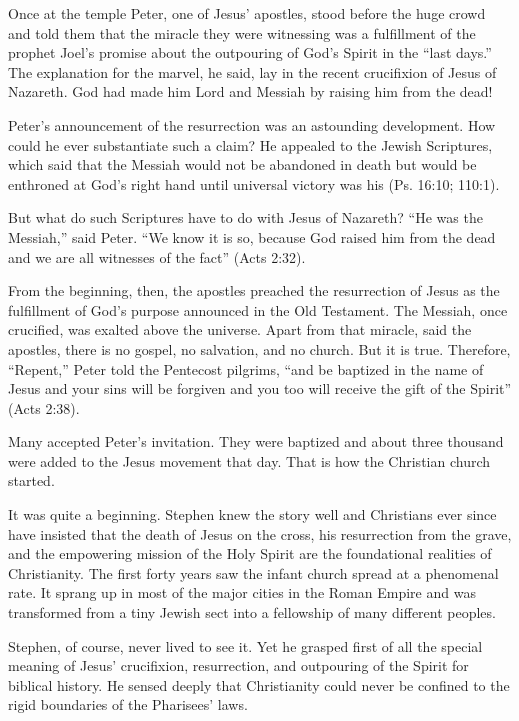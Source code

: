 Once at the temple Peter, one of Jesus’ apostles, stood before the huge crowd and told them that the
miracle they were witnessing was a fulfillment of the prophet Joel’s promise about the outpouring of
God’s Spirit in the “last days.” The explanation for the marvel, he said, lay in the recent
crucifixion of Jesus of Nazareth. God had made him Lord and Messiah by raising him from the dead!

Peter’s announcement of the resurrection was an astounding development. How could he ever
substantiate such a claim? He appealed to the Jewish Scriptures, which said that the Messiah would
not be abandoned in death but would be enthroned at God’s right hand until universal victory was his
(Ps. 16:10; 110:1).

But what do such Scriptures have to do with Jesus of Nazareth? “He was the Messiah,” said Peter. “We
know it is so, because God raised him from the dead and we are all witnesses of the fact” (Acts
2:32).

From the beginning, then, the apostles preached the resurrection of Jesus as the fulfillment of
God’s purpose announced in the Old Testament. The Messiah, once crucified, was exalted above the
universe. Apart from that miracle, said the apostles, there is no gospel, no salvation, and no
church. But it is true. Therefore, “Repent,” Peter told the Pentecost pilgrims, “and be baptized in
the name of Jesus and your sins will be forgiven and you too will receive the gift of the Spirit”
(Acts 2:38).

Many accepted Peter’s invitation. They were baptized and about three thousand were added to the
Jesus movement that day. That is how the Christian church started.

It was quite a beginning. Stephen knew the story well and Christians ever since have insisted that
the death of Jesus on the cross, his resurrection from the grave, and the empowering mission of the
Holy Spirit are the foundational realities of Christianity. The first forty years saw the infant
church spread at a phenomenal rate. It sprang up in most of the major cities in the Roman Empire and
was transformed from a tiny Jewish sect into a fellowship of many different peoples.

Stephen, of course, never lived to see it. Yet he grasped first of all the special meaning of Jesus’
crucifixion, resurrection, and outpouring of the Spirit for biblical history. He sensed deeply that
Christianity could never be confined to the rigid boundaries of the Pharisees’ laws.

